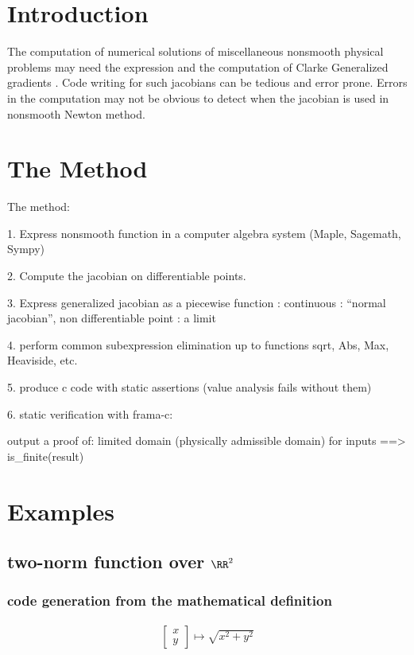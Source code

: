 \documentclass[a4paper]{article}
\begin{document}
\makeRT

\newpage
\tableofcontents
\newpage

\section{Introduction}
The computation of numerical solutions of miscellaneous nonsmooth physical
problems may need the expression and the computation of Clarke Generalized
gradients \cite{Clarke1975}.  Code writing for such jacobians can be tedious
and error prone. Errors in the computation may not be obvious to detect when
the jacobian is used in nonsmooth Newton method.


\section{The Method}


The method:

1. Express nonsmooth function in a computer algebra system (Maple, Sagemath, Sympy)

2. Compute the jacobian on differentiable points.

3. Express generalized jacobian as a piecewise function : continuous : ``normal jacobian'',  non differentiable point : a limit

4. perform common subexpression elimination up to functions sqrt, Abs, Max, Heaviside, etc.

5. produce c code with static assertions (value analysis fails without them)

6. static verification with frama-c:

output a proof of: limited domain (physically admissible domain) for inputs ==> is\_finite(result)

\section{Examples}

\subsection{two-norm function over $\RR^2$}

\subsubsection{code generation from the mathematical definition}
\begin{equation}
  \begin{array}{ll}
  \left [\begin{array}{c}
    x\\
    y
    \end{array} \right] \mapsto \sqrt{x^2+y^2}
  \end{array}
\end{equation}
\end{document}
